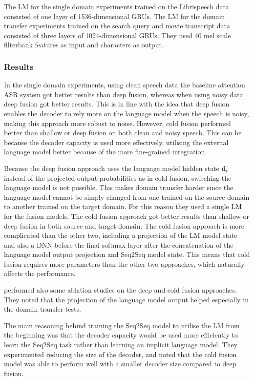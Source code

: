 \documentclass[11pt]{article}
\begin{document}
The LM for the single domain experiments trained on the Librispeech data consisted of one layer of 1536-dimensional GRUs. The LM for the  domain transfer experiments trained on the search query and movie transcript data consisted of three layers of 1024-dimensional GRUs. They used 40 mel scale filterbank features as input and characters as output.

\subsubsection{Results}
In the single domain experiments, using clean speech data the baseline attention ASR system got better results than deep fusion, whereas when using noisy data deep fusion got better results. This is in line with the idea that deep fusion enables the decoder to rely more on the language model when the speech is noisy, making this approach more robust to noise. However, cold fusion performed better than shallow or deep fusion on both clean and noisy speech. This can be because the decoder capacity is used more effectively, utilising the external language model better because of the more fine-grained integration.

Because the deep fusion approach uses the language model hidden state $\boldsymbol{d}_t$ instead of the projected output probabilities as in cold fusion, switching the language model is not possible. This makes domain transfer harder since the language model cannot be simply changed from one trained on the source domain to another trained on the target domain. For this reason they used a single LM for the fusion models. The cold fusion approach got better results than shallow or deep fusion in both source and target domain. The cold fusion approach is more complicated than the other two, including a projection of the LM model state and also a DNN before the final softmax layer after the concatenation of the language model output projection and Seq2Seq model state. This means that cold fusion requires more parameters than the other two approaches, which naturally affects the performance.

\citet{sriram2017cold} performed also some ablation studies on the deep and cold fusion approaches. They noted that the projection of the language model output helped especially in the domain transfer tests.

The main reasoning behind training the Seq2Seq model to utilise the LM from the beginning was that the decoder capacity would be used more efficiently to learn the Seq2Seq task rather than learning an implicit language model. They experimented reducing the size of the decoder, and noted that the cold fusion model was able to perform well with a smaller decoder size compared to deep fusion.
\end{document}
